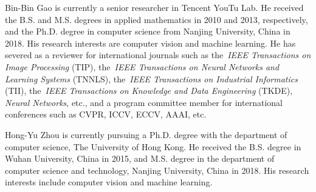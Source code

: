 \documentclass[journal]{IEEEtran}
\begin{document}


\begin{IEEEbiography}{Bin-Bin Gao} is currently a senior researcher in Tencent YouTu Lab. He received the B.S. and M.S. degrees in applied mathematics in 2010 and 2013, respectively, and the Ph.D. degree in computer science from Nanjing University, China in 2018. His research interests are computer vision and machine learning. He has severed as a reviewer for international journals such as the~\emph{IEEE Transactions on Image Processing} (TIP), the~\emph{IEEE Transactions on Neural Networks and Learning Systems} (TNNLS),  the~\emph{IEEE Transactions on Industrial Informatics} (TII), the~\emph{IEEE Transactions on Knowledge and Data Engineering} (TKDE), \emph{Neural Networks}, etc.,  and a program committee member for international conferences such as CVPR, ICCV, ECCV, AAAI, etc.

\end{IEEEbiography}
\begin{IEEEbiography}{Hong-Yu Zhou} is currently pursuing a Ph.D. degree with the department of computer science, The University of Hong Kong. He received the B.S. degree in Wuhan University, China in 2015, and M.S. degree in the department of computer science and technology, Nanjing University, China in 2018. His research interests include computer vision and machine learning.

\end{IEEEbiography}
\end{document}
